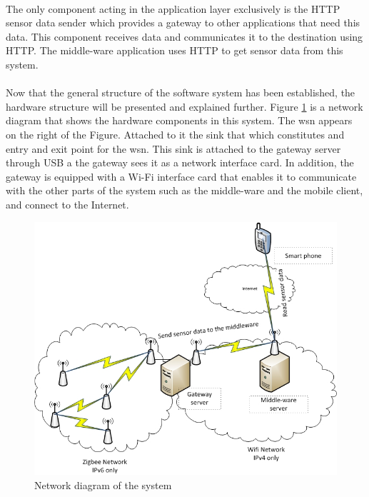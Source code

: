 \documentclass[12pt,a4paper,final]{report}
\begin{document}
\paragraph{}
The only component acting in the application layer exclusively is the HTTP sensor data sender which provides a gateway to other applications that need this data. This component receives data and communicates it to the destination using HTTP. The middle-ware application uses HTTP to get sensor data from this system.
\paragraph{}
Now that the general structure of the software system has been established, the hardware structure will be presented and explained further. Figure \ref{fig:network_diagram} is a network diagram that shows the hardware components in this system. The \gls{wsn} appears on the right of the Figure. Attached to it the sink that which constitutes and entry and exit point for the \gls{wsn}. This sink is attached to the gateway server through USB a the gateway sees it as a network interface card. In addition, the gateway is equipped with a Wi-Fi interface card that enables it to communicate with the other parts of the system such as the middle-ware and the mobile client, and connect to the Internet.

\begin{figure}[htbp]
\centering
\includegraphics[scale=0.8]{img/network_diagram.jpg}
\caption{Network diagram of the system}
\label{fig:network_diagram}
\end{figure}
\clearpage
\end{document}
